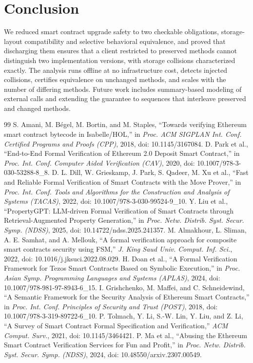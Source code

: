 \documentclass[journal]{IEEEtran}
\begin{document}
\section{Conclusion}
\label{sec:conclusion}
We reduced smart contract upgrade safety to two checkable obligations, storage-layout compatibility and selective behavioral equivalence, and proved that discharging them ensures that a client restricted to preserved methods cannot distinguish two implementation versions, with storage collisions characterized exactly. The analysis runs offline at no infrastructure cost, detects injected collisions, certifies equivalence on unchanged methods, and scales with the number of differing methods. Future work includes summary-based modeling of external calls and extending the guarantee to sequences that interleave preserved and changed methods.

\begin{thebibliography}{99}
 S. Amani, M. B\'egel, M. Bortin, and M. Staples, ``Towards verifying Ethereum smart contract bytecode in Isabelle/HOL,'' in \emph{Proc. ACM SIGPLAN Int. Conf. Certified Programs and Proofs (CPP)}, 2018, doi: 10.1145/3167084.
 D. Park et al., ``End-to-End Formal Verification of Ethereum 2.0 Deposit Smart Contract,'' in \emph{Proc. Int. Conf. Computer Aided Verification (CAV)}, 2020, doi: 10.1007/978-3-030-53288-8\_8.
 D. L. Dill, W. Grieskamp, J. Park, S. Qadeer, M. Xu et al., ``Fast and Reliable Formal Verification of Smart Contracts with the Move Prover,'' in \emph{Proc. Int. Conf. Tools and Algorithms for the Construction and Analysis of Systems (TACAS)}, 2022, doi: 10.1007/978-3-030-99524-9\_10.
 Y. Liu et al., ``PropertyGPT: LLM-driven Formal Verification of Smart Contracts through Retrieval-Augmented Property Generation,'' in \emph{Proc. Netw. Distrib. Syst. Secur. Symp. (NDSS)}, 2025, doi: 10.14722/ndss.2025.241357.
 M. Almakhour, L. Sliman, A. E. Samhat, and A. Mellouk, ``A formal verification approach for composite smart contracts security using FSM,'' \emph{J. King Saud Univ. Comput. Inf. Sci.}, 2022, doi: 10.1016/j.jksuci.2022.08.029.
 H. Doan et al., ``A Formal Verification Framework for Tezos Smart Contracts Based on Symbolic Execution,'' in \emph{Proc. Asian Symp. Programming Languages and Systems (APLAS)}, 2024, doi: 10.1007/978-981-97-8943-6\_15.
 I. Grishchenko, M. Maffei, and C. Schneidewind, ``A Semantic Framework for the Security Analysis of Ethereum Smart Contracts,'' in \emph{Proc. Int. Conf. Principles of Security and Trust (POST)}, 2018, doi: 10.1007/978-3-319-89722-6\_10.
 P. Tolmach, Y. Li, S.-W. Lin, Y. Liu, and Z. Li, ``A Survey of Smart Contract Formal Specification and Verification,'' \emph{ACM Comput. Surv.}, 2021, doi: 10.1145/3464421.
 P. Ma et al., ``Abusing the Ethereum Smart Contract Verification Services for Fun and Profit,'' in \emph{Proc. Netw. Distrib. Syst. Secur. Symp. (NDSS)}, 2024, doi: 10.48550/arxiv.2307.00549.
\end{thebibliography}
\end{document}
